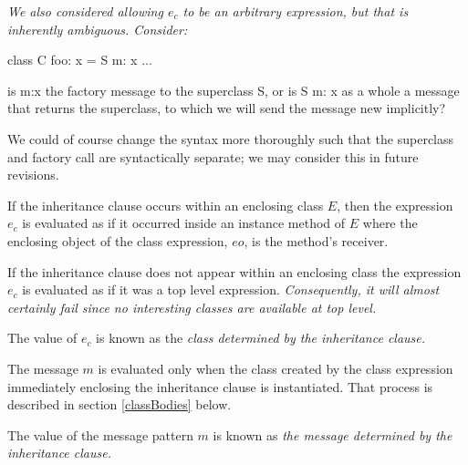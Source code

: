 \documentclass{article}
\begin{document}
 {\em
We also considered allowing $e_c$ to be an arbitrary expression, but that is inherently ambiguous. Consider:

class C foo: x = S m: x ...

  is m:x the factory message to the superclass S, or is S m: x as a whole a message that returns the superclass, to which we will send the message new implicitly? 
  
 We could of course change the syntax more thoroughly such that the superclass and factory call are syntactically separate; we may consider this in future revisions. 
  }
  
If the inheritance clause occurs within an enclosing class $E$, then the expression $e_c$ is evaluated as if it occurred inside an instance method of $E$ where the enclosing object of the class expression, $eo$, is the method's receiver. 


If the inheritance clause does not appear within an enclosing class the expression $e_c$ is evaluated as if it was a top level expression. 
{\em 
Consequently, it will almost certainly fail since no interesting classes are available at top level.
}

The value of $e_c$ is known as the {\em class determined by the inheritance clause.}

The message $m$ is evaluated only when the class created by the class expression immediately enclosing the inheritance clause is instantiated.
That process is described in section \ref{classBodies} below.

The value of the message pattern $m$  is known as {\em the message determined by the inheritance clause.}

 

\end{document}
